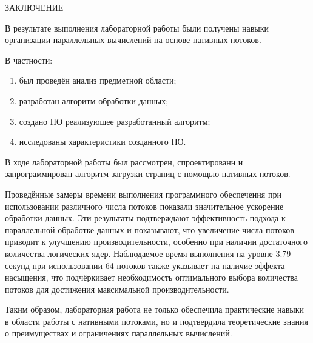 \begin{center}
    \MakeUppercase{\large Заключение}
\end{center}

В результате выполнения лабораторной работы были получены навыки организации параллельных вычислений на основе нативных потоков.

\vspace{0.25cm}
В частности:

\begin{enumerate}

\item был проведён анализ предметной области;

\item разработан алгоритм обработки данных;

\item создано ПО реализующее разработанный алгоритм;

\item исследованы характеристики созданного ПО.

\end{enumerate}

В ходе лабораторной работы был рассмотрен, спроектированн и запрограммирован алгоритм загрузки страниц с помощью нативных потоков.

Проведённые замеры времени выполнения программного обеспечения при использовании различного числа потоков показали значительное ускорение обработки данных. Эти результаты подтверждают эффективность подхода к параллельной обработке данных и показывают, что увеличение числа потоков приводит к улучшению производительности, особенно при наличии достаточного количества логических ядер. Наблюдаемое время выполнения на уровне 3.79 секунд при использовании 64 потоков также указывает на наличие эффекта насыщения, что подчёркивает необходимость оптимального выбора количества потоков для достижения максимальной производительности.

Таким образом, лабораторная работа не только обеспечила практические навыки в области работы с нативными потоками, но и подтвердила теоретические знания о преимуществах и ограничениях параллельных вычислений.

\newpage